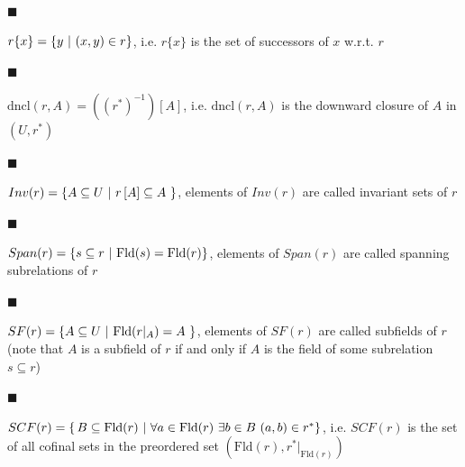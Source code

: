  
 
\par\noindent  $\blacksquare$ 
 
$r\{x\}=\{y\leavevmode\nobreak\ |\leavevmode\nobreak\ (x,y)\in r\}$, i.e. $r\{x\}$ is the set of successors of $x$ w.r.t. $r$\par
 
 
 
\par\noindent  $\blacksquare$ 
 
$\mathrm{dncl}(r,A)=((r^{*})^{-1})[A]$, i.e. $\mathrm{dncl}(r,A)$ is the downward closure of $A$ in $(U,r^{*})$\par
 
 
 
\par\noindent  $\blacksquare$ 
 
$Inv(r)=\{A\subseteq U\leavevmode\nobreak\ |\leavevmode\nobreak\ r\left[A\right%
]\subseteq A\leavevmode\nobreak\ \}$, elements of $Inv(r)$ are called invariant sets of $r$\par
 
 
 
\par\noindent  $\blacksquare$ 
 
$Span(r)=\{s\subseteq r\leavevmode\nobreak\ |\leavevmode\nobreak\ \mathrm{Fld}(%
s)=\mathrm{Fld}(r)\}$, elements of $Span(r)$ are called spanning subrelations of $r$\par
 
 
 
\par\noindent  $\blacksquare$ 
 
$SF(r)=\{A\subseteq U\leavevmode\nobreak\ |\leavevmode\nobreak\ \mathrm{Fld}(r|%
_{A})=A\leavevmode\nobreak\ \}$, elements of $SF(r)$ are called subfields of $r$ (note that $A$ is a subfield of $r$ if and only if $A$ is the field of some subrelation $s\subseteq r$)\par
 
 
 
\par\noindent  $\blacksquare$ 
 
$SCF(r)=\{\,B\subseteq\mathrm{Fld}(r)\leavevmode\nobreak\ |\leavevmode\nobreak%
\ \forall a\in\mathrm{Fld}(r)\leavevmode\nobreak\ \exists b\in B\leavevmode%
\nobreak\ (a,b)\in r^{*}\}$, i.e. $SCF(r)$ is the set of all cofinal sets in the preordered set $(\mathrm{Fld}(r),r^{*}|_{\mathrm{Fld}(r)})$\par
 
